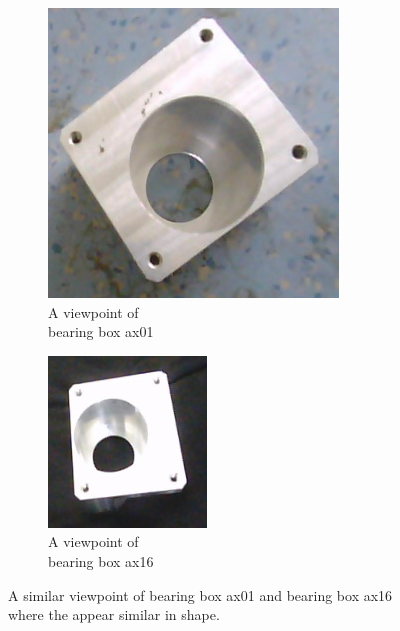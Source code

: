 \begin{itemize}
\begin{figure}[!htb]
	\centering
	\begin{subfigure}{.3\textwidth}
  		\centering
  		\includegraphics[width=.5\linewidth]{images/ax01_similar}
  		\caption{A viewpoint of \\bearing box ax01}
  		\label{Fig:sim2a}
	\end{subfigure}%
	\begin{subfigure}{.3\textwidth}
  		\centering
  		\includegraphics[width=.5\linewidth]{images/ax16_similar}
  		\caption{A viewpoint of \\bearing box ax16}
  		\label{Fig:sim2b}
	\end{subfigure}%
	\caption{A similar viewpoint of bearing box ax01 and bearing box ax16 where the appear similar in shape.}
	\label{Fig:sim2}
\end{figure}	
	\end{itemize}
	
